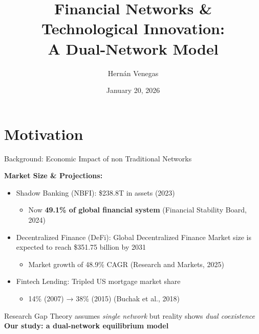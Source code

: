 \documentclass[aspectratio=169]{beamer}
\title[Financial Networks]{Financial Networks \& Technological Innovation: \\ A Dual-Network Model}
\author{Hernán Venegas}
\institute{Universidad de Los Andes}
\date{January 20, 2026}
\begin{document}
\frame{\titlepage}

\section{Motivation}

\begin{frame}{Background: Economic Impact of non Traditional Networks}

\textbf{Market Size \& Projections:}

\begin{itemize}
    \item \alert{Shadow Banking (NBFI)}: \$238.8T in assets (2023)
    \begin{itemize}
        \item[-] Now \textbf{49.1\% of global financial system} (Financial Stability Board, 2024)
    \end{itemize}
    
    \vspace{0.3cm}
    
    \item \alert{Decentralized Finance (DeFi)}: Global Decentralized Finance Market size is expected to reach \$351.75 billion by 2031
    \begin{itemize}
        \item[-] Market growth of 48.9\% CAGR (Research and Markets, 2025)
    \end{itemize}
    
    \vspace{0.3cm}
    
    \item \alert{Fintech Lending}: Tripled US mortgage market share
    \begin{itemize}
        \item[-] 14\% (2007) → 38\% (2015) (Buchak et al., 2018)
    \end{itemize}
\end{itemize}

\vspace{0.4cm}

\begin{alertblock}{Research Gap}
\centering
Theory assumes \textit{single network} but reality shows \textit{dual coexistence}\\
\textbf{Our study: a dual-network equilibrium model}
\end{alertblock}

\end{frame}
\end{document}

